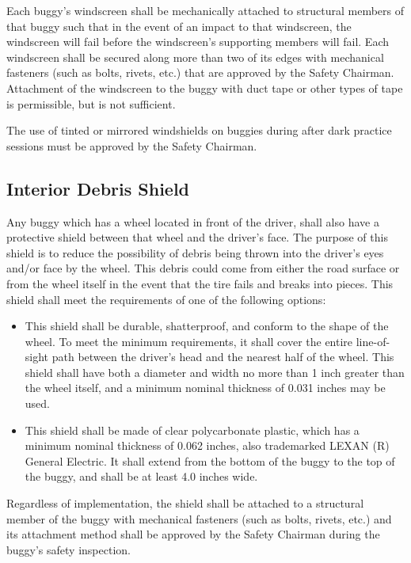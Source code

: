	Each buggy's windscreen shall be mechanically attached to structural members of that buggy such that in the event of an impact to that windscreen, the windscreen will fail before the windscreen's supporting members will fail. Each windscreen shall be secured along more than two of its edges with mechanical fasteners (such as bolts, rivets, etc.) that are approved by the Safety Chairman. Attachment of the windscreen to the buggy with duct tape or other types of tape is permissible, but is not sufficient.
	
	The use of tinted or mirrored windshields on buggies during after dark practice sessions must be approved by the Safety Chairman.

\subsection{Interior Debris Shield}

	Any buggy which has a wheel located in front of the driver, shall also have a protective shield between that wheel and the driver's face. The purpose of this shield is to reduce the possibility of debris being thrown into the driver's eyes and/or face by the wheel. This debris could come from either the road surface or from the wheel itself in the event that the tire fails and breaks into pieces. This shield shall meet the requirements of one of the following options:

	\begin{itemize}

		\item
		This shield shall be durable, shatterproof, and conform to the shape of the wheel. To meet the minimum requirements, it shall cover the entire line-of-sight path between the driver's head and the nearest half of the wheel. This shield shall have both a diameter and width no more than 1 inch greater than the wheel itself, and a minimum nominal thickness of 0.031 inches may be used.

		\item
		This shield shall be made of clear polycarbonate plastic, which has a minimum nominal thickness of 0.062 inches, also trademarked LEXAN (R) General Electric. It shall extend from the bottom of the buggy to the top of the buggy, and shall be at least 4.0 inches wide.

	\end{itemize}

	Regardless of implementation, the shield shall be attached to a structural member of the buggy with mechanical fasteners (such as bolts, rivets, etc.) and its attachment method shall be approved by the Safety Chairman during the buggy's safety inspection.
